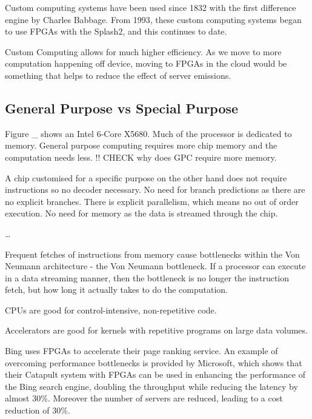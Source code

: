 \documentclass[a4paper]{scrartcl}
\begin{document}
Custom computing systems have been used since 1832 with the first difference engine
by Charles Babbage. From 1993, these custom computing systems began to use FPGAs 
with the Splash2, and this continues to date. 

Custom Computing allows for much higher efficiency. As we move to more computation
happening off device, moving to FPGAs in the cloud would be something that helps 
to reduce the effect of server emissions. 

\subsection{General Purpose vs Special Purpose}

Figure \_ shows an Intel 6-Core X5680. Much of the processor is dedicated to memory. 
General purpose computing requires more chip memory and the computation needs less. 
!! CHECK why does GPC require more memory. 

A chip customised for a specific purpose on the other hand does not require instructions
so no decoder necessary. No need for branch predictions as there are no explicit branches.
There is explicit parallelism, which means no out of order execution. No need for memory
as the data is streamed through the chip. 

\dots

Frequent fetches of instructions from memory cause bottlenecks within the Von 
Neumann architecture - the Von Neumann bottleneck. If a processor can execute 
in a data streaming manner, then the bottleneck is no longer the instruction fetch, 
but how long it actually takes to do the computation. 

\begin{definition}
CPUs are good for control-intensive, non-repetitive code. 

Accelerators are good for kernels with repetitive programs on large data volumes. 

\end{definition}

\begin{example}
    Bing uses FPGAs to accelerate their page ranking service. 
    An example of overcoming performance bottlenecks is provided by
    Microsoft, which shows that their Catapult system with FPGAs can be used in
    enhancing the performance of the Bing search engine, doubling the
    throughput while reducing the latency by almost 30\%. Moreover the number
    of servers are reduced, leading to a cost reduction of 30\%.
\end{example}
\end{document}
